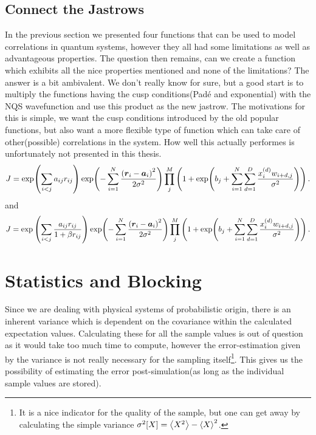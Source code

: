     \subsection{Connect the Jastrows}
        In the previous section we presented four functions that can be used to
        model correlations in quantum systems, however they all had some
        limitations as well as advantageous properties. The question then
        remains, can we create a function which exhibits all the nice
        properties mentioned and none of the limitations? The answer is a bit
        ambivalent. We don't really know for sure, but a good start is to
        multiply the functions having the cusp conditions(Pad\'e and
        exponential) with the NQS wavefunction and use this product as the new
        jastrow. The motivations for this is simple, we want the cusp
        conditions introduced by the old popular functions, but also want a
        more flexible type of function which can take care of other(possible)
        correlations in the system. How well this actually performes is
        unfortunately not presented in this thesis.
            \begin{equation}
                J = \exp(\sum\limits_{i<j}a_{ij} r_{ij})
                \exp(-\suml{i=1}{N} \frac{\left(\blds{r}_i -
                \blds{a}_i\right)^2}{2\sigma^2})\prod\limits^{M}_j \left(1 +
                \exp(b_j + \suml{i=1}{N}\suml{d=1}{D}
                \frac{x^{(d)}_iw_{i+d,j}}{\sigma^2})\right).
            \end{equation}
        and
            \begin{equation}
                J = \exp\left(\sum\limits_{i<j}\frac{a_{ij} r_{ij}}{1 + \beta
                r_{ij}}\right) \exp(-\suml{i=1}{N} \frac{\left(\blds{r}_i -
                \blds{a}_i\right)^2}{2\sigma^2})\prod\limits^{M}_j \left(1 +
                \exp(b_j + \suml{i=1}{N}\suml{d=1}{D}
                \frac{x^{(d)}_iw_{i+d,j}}{\sigma^2})\right).
            \end{equation}

\section{Statistics and Blocking}
    Since we are dealing with physical systems of probabilistic origin, there
    is an inherent variance which is dependent on the covariance within the
    calculated expectation values. Calculating these for all the sample values
    is out of question as it would take too much time to compute, however the
    error-estimation given by the variance is not really necessary for the
    sampling itself\footnote{It is a nice indicator for the quality of the
    sample, but one can get away by calculating the simple variance
    $\sigma^2[X]=\ecp{X^2} - \ecp{X}^2$.}. This gives us the possibility of
    estimating the error post-simulation(as long as the individual sample
    values are stored).

